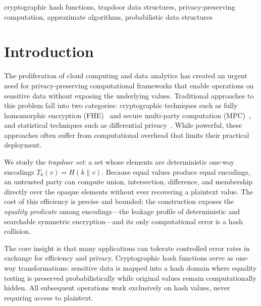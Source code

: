 \documentclass[10pt,conference]{IEEEtran}
\begin{document}
\begin{IEEEkeywords}
cryptographic hash functions, trapdoor data structures, privacy-preserving computation, approximate algorithms, probabilistic data structures
\end{IEEEkeywords}

\section{Introduction}

The proliferation of cloud computing and data analytics has created an urgent need for privacy-preserving computational frameworks that enable operations on sensitive data without exposing the underlying values. Traditional approaches to this problem fall into two categories: cryptographic techniques such as fully homomorphic encryption (FHE)~\cite{gentry2009fully} and secure multi-party computation (MPC)~\cite{yao1982protocols}, and statistical techniques such as differential privacy~\cite{dwork2006calibrating}. While powerful, these approaches often suffer from computational overhead that limits their practical deployment.

We study the \emph{trapdoor set}: a set whose elements are deterministic one-way encodings $T_k(v) = H(k \| v)$. Because equal values produce equal encodings, an untrusted party can compute union, intersection, difference, and membership directly over the opaque elements without ever recovering a plaintext value. The cost of this efficiency is precise and bounded: the construction exposes the \emph{equality predicate} among encodings---the leakage profile of deterministic and searchable symmetric encryption---and its only computational error is a hash collision.

The core insight is that many applications can tolerate controlled error rates in exchange for efficiency and privacy. Cryptographic hash functions serve as one-way transformations: sensitive data is mapped into a hash domain where equality testing is preserved probabilistically while original values remain computationally hidden. All subsequent operations work exclusively on hash values, never requiring access to plaintext.
\end{document}
